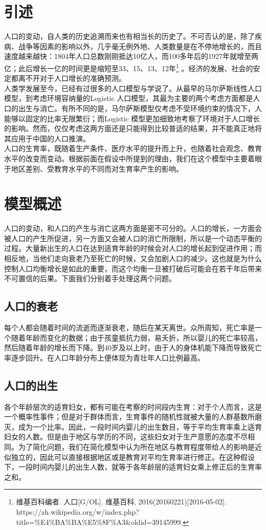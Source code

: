 \documentclass[a4paper]{article}
\begin{document}
\section{引述}
人口的变动，自人类的历史追溯而来也有相当长的历史了。不可否认的是，除了疾病、战争等因素的影响以外，几乎毫无例外地、人类数量是在不停地增长的，而且速度越来越快：1804年人口总数刚刚抵达10亿人，而100多年后的1927年就增至两亿；此后增长一亿的时间更是缩短至33、15、13、12年\footnote{维基百科编者. 人口[G/OL]. 维基百科, 2016(20160221)[2016-05-02]. https://zh.wikipedia.org/w/index.php?title=\%E4\%BA\%BA\%E5\%8F\%A3\&oldid=39145999.} 。经济的发展、社会的安定都离不开对于人口增长的准确预测。\\
\indent
人类学发展至今，已经有过很多的人口模型与学说了。从最早的马尔萨斯线性人口模型，到考虑环境容纳量的Logistic 人口模型，其最为主要的两个考虑方面都是人口的出生与消亡。有所不同的是，马尔萨斯模型仅考虑不受环境约束的情况下，人能够以固定的比率无限繁衍；而Logistic 模型更加细致地考察了环境对于人口增长的影响。然而，仅仅考虑这两方面还是只能得到比较普适的结果，并不能真正地将其应用于中国的人口推演。\\
\indent
人口的生育率，既随着生产条件、医疗水平的提升而上升，也随着社会观念、教育水平的改变而变动。根据前面在假设中所提到的理由，我们在这个模型中主要着眼于地区差别、受教育水平的不同而对生育率产生的影响。
\section{模型概述}
人口的变动，和人口的产生与消亡这两方面是密不可分的。人口的增长，一方面会被人口的产生所促进，另一方面又会被人口的消亡所限制，所以是一个动态平衡的过程。大量新出生的人口在达到适育年龄的时候会对人口的增长起到促进作用；而相反地，当他们走向衰老乃至死亡的时候，又会加剧人口的减少。这也就是为什么控制人口均衡增长是如此的重要，而这个均衡一旦被打破后可能会在若干年后带来不可置信的后果。下面我们分别着手处理这两个问题。
\subsection{人口的衰老}
每个人都会随着时间的流逝而逐渐衰老，随后在某天离世。众所周知，死亡率是一个随着年龄而变化的数据；由于孩童抵抗力弱，易夭折，所以婴儿的死亡率较高，然后随着年龄的增长而下降。到40岁及以上时，由于人的身体机能下降而导致死亡率逐步回升。在人口年龄分布上便体现为青壮年人口比例最高。
\subsection{人口的出生}
各个年龄层次的适育妇女，都有可能在考察的时间段内生育：对于个人而言，这是一个概率性事件；但是对于群体而言，生育事件的随机性就被大量的人群基数所磨灭，成为一个比率。因此，一段时间内婴儿的出生数目，等于平均生育率乘上适育妇女的人数。但是由于地区与学历的不同，这些妇女对于生产意愿的态度不尽相同。为了简化问题，我们在简化模型中认为所在地区与教育程度带给人的影响是近似独立的，因此可以直接根据地区或是教育对平均生育率进行修正。在这种假设下，一段时间内婴儿的出生人数，就等于各年龄层的适育妇女乘上修正后的生育率之和。
\end{document}
